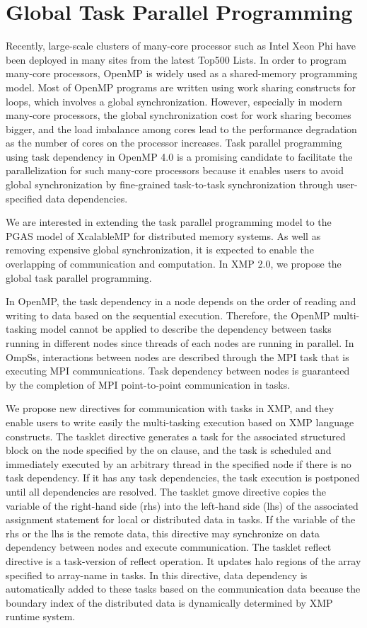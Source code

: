 ﻿\documentclass[graybox]{svmult}
\begin{document}
\section{Global Task Parallel Programming}

Recently, large-scale clusters of many-core processor such as Intel Xeon Phi have been deployed in many sites from the latest Top500 Lists. In order to program many-core processors, OpenMP is widely used as a shared-memory programming model. Most of OpenMP programs are written using work sharing constructs for loops, which involves a global synchronization.
However, especially in modern many-core processors, the global synchronization cost for work sharing becomes bigger, and the load imbalance among cores lead to the performance degradation as the number of cores on the processor increases.
Task parallel programming using task dependency in OpenMP 4.0 is a promising candidate to facilitate the parallelization for such many-core processors because it enables users to avoid global synchronization by fine-grained task-to-task synchronization through user-specified data dependencies.

We are interested in extending the task parallel programming model to the PGAS model of XcalableMP for distributed memory systems.
As well as removing expensive global synchronization,
it is expected to enable the overlapping of communication and computation.
In XMP 2.0, we propose the global task parallel programming.

In OpenMP, the task dependency in a node depends on the order of reading and writing to data based on the sequential execution. Therefore, the OpenMP multi-tasking model cannot be applied to describe the dependency between tasks running in different nodes since threads of each nodes are running in parallel. In OmpSs, interactions between nodes are described through the MPI task that is executing MPI communications. Task dependency between nodes is guaranteed by the completion of MPI point-to-point communication in tasks. 

We propose new directives for communication with tasks in XMP, and they enable users to write easily the multi-tasking execution based on XMP language constructs. The tasklet directive generates a task for the associated structured block
 on the node specified by the on clause, and the task is scheduled and immediately executed by an arbitrary thread in the specified node if there is no task dependency. If it has any task dependencies, the task execution is postponed until all dependencies are resolved. The tasklet gmove directive copies the variable of the right-hand side (rhs) into the left-hand side (lhs) of the associated assignment statement for local or distributed data in tasks. If the variable of the rhs or the lhs is the remote data, this directive may synchronize on data dependency between nodes and execute communication. The tasklet reflect directive is a task-version of reflect operation. It updates halo regions of the array specified to array-name in tasks. In this directive, data dependency is automatically added to these tasks based on the communication data because the boundary index of the distributed data is dynamically determined by XMP runtime system.
\end{document}
